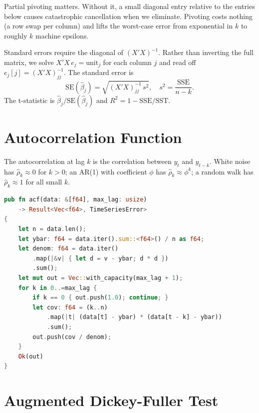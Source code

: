 \begin{keyinsight}
Partial pivoting matters. Without it, a small diagonal entry relative to the
entries below causes catastrophic cancellation when we eliminate. Pivoting
costs nothing (a row swap per column) and lifts the worst-case error from
exponential in $k$ to roughly $k$ machine epsilons.
\end{keyinsight}

Standard errors require the diagonal of $(X'X)^{-1}$. Rather than inverting the
full matrix, we solve $X'X\, e_j = \text{unit}_j$ for each column $j$ and read
off $e_j[j] = (X'X)^{-1}_{jj}$. The standard error is
\[
\text{SE}(\hat\beta_j) = \sqrt{(X'X)^{-1}_{jj} \, s^2},
\quad s^2 = \frac{\text{SSE}}{n - k}.
\]
The t-statistic is $\hat\beta_j / \text{SE}(\hat\beta_j)$ and
$R^2 = 1 - \text{SSE}/\text{SST}$.

\section{Autocorrelation Function}


The autocorrelation at lag $k$ is the correlation between $y_t$ and
$y_{t-k}$. White noise has $\hat\rho_k \approx 0$ for $k > 0$; an AR(1) with
coefficient $\phi$ has $\hat\rho_k \approx \phi^k$; a random walk has
$\hat\rho_k \approx 1$ for all small $k$.

\begin{lstlisting}[language=Rust]
pub fn acf(data: &[f64], max_lag: usize)
    -> Result<Vec<f64>, TimeSeriesError>
{
    let n = data.len();
    let ybar: f64 = data.iter().sum::<f64>() / n as f64;
    let denom: f64 = data.iter()
        .map(|&v| { let d = v - ybar; d * d })
        .sum();
    let mut out = Vec::with_capacity(max_lag + 1);
    for k in 0..=max_lag {
        if k == 0 { out.push(1.0); continue; }
        let cov: f64 = (k..n)
            .map(|t| (data[t] - ybar) * (data[t - k] - ybar))
            .sum();
        out.push(cov / denom);
    }
    Ok(out)
}
\end{lstlisting}

\section{Augmented Dickey-Fuller Test}

